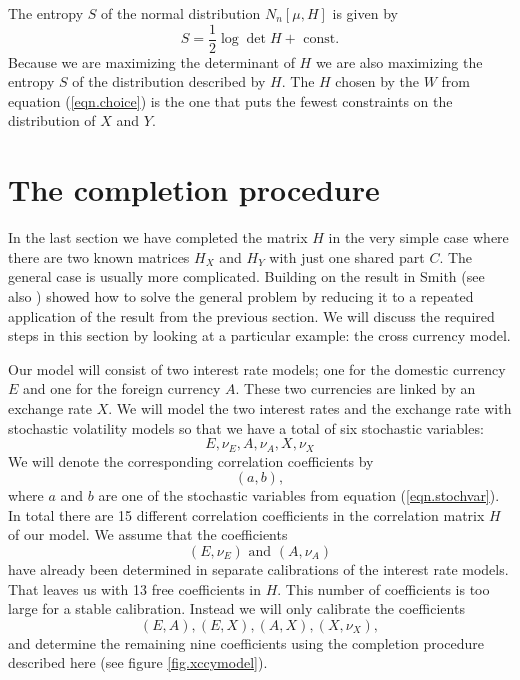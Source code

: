 \documentclass[11pt, a4paper]{article}
\begin{document}
The entropy $S$ of the normal distribution $N_n[\mu,H]$ is given by
\begin{equation}
	S = \frac{1}{2}\log \det H + \text{\ const.}
\end{equation} 
Because we are maximizing the determinant of $H$ we are also maximizing the entropy $S$ of the distribution described by $H$. The $H$ chosen by the $W$ from equation (\ref{eqn.choice}) is the one that puts the fewest constraints on the distribution of $X$ and $Y$. 

\section{The completion procedure}\label{sec.procedure}
In the last section we have completed the matrix $H$ in the very simple case where there are two known matrices $H_X$ and $H_Y$ with just one shared part $C$. The general case is usually more complicated. Building on the result in \cite{grone} Smith \cite{smith} (see also \cite{georgescu}) showed how to solve the general problem by reducing it to a repeated application of the result from the previous section. We will discuss the required steps in this section by looking at a particular example: the cross currency model.

Our model will consist of two interest rate models; one for the domestic currency $E$ and one for the foreign currency $A$. These two currencies are linked by an exchange rate $X$. We will model the two interest rates and the exchange rate with stochastic volatility models so that we have a total of six stochastic variables:
\begin{equation}\label{eqn.stochvar}
	E, \nu_E, A, \nu_A, X, \nu_X
\end{equation}
We will denote the corresponding correlation coefficients by 
\begin{equation}
	(a,b),
\end{equation}
where $a$ and $b$ are one of the stochastic variables from equation (\ref{eqn.stochvar}). In total there are 15 different correlation coefficients in the correlation matrix $H$ of our model. We assume that the coefficients 
\begin{equation}
	(E,\nu_E)\text{\ and\ }(A,\nu_A)
\end{equation}
have already been determined in separate calibrations of the interest rate models. That leaves us with 13 free coefficients in $H$. This number of coefficients is too large for a stable calibration. Instead we will only calibrate the coefficients
\begin{equation}
	(E,A), (E,X), (A,X),(X,\nu_X),
\end{equation}
and determine the remaining nine coefficients using the completion procedure described here (see figure \ref{fig.xccymodel}).
\end{document}
